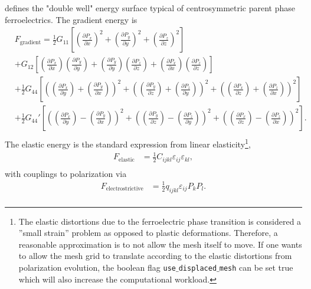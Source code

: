 \documentclass[paper=a4,14pt]{scrartcl} %
\begin{document}
%
defines the "double well" energy surface typical of centrosymmetric parent phase ferroelectrics. The gradient energy is
%
\begin{align}\label{grad}
&F_\mathrm{gradient}=\frac{1}{2} G_{11}  \left[ \left(\frac{\partial P_x}{\partial x} \right)^2 + \left(\frac{\partial P_y}{\partial y} \right)^2+\left(\frac{\partial P_z}{\partial z} \right)^2 \right] \\ \nonumber
&+  G_{12}  \left[\left(\frac{\partial P_x}{\partial x} \right)\left(\frac{\partial P_y}{\partial y} \right) + \left(\frac{\partial P_y}{\partial y} \right)\left(\frac{\partial P_z}{\partial z} \right) + \left(\frac{\partial P_x}{\partial x} \right)\left(\frac{\partial P_z}{\partial z} \right)\right] \\ \nonumber
&+ \frac{1}{2}G_{44} \left[\left(\left(\frac{\partial P_x}{\partial y} \right) + \left(\frac{\partial P_y}{\partial x} \right) \right)^2+ \left(\left(\frac{\partial P_y}{\partial z} \right) + \left(\frac{\partial P_z}{\partial y} \right) \right)^2+ \left(\left(\frac{\partial P_x}{\partial z} \right) + \left(\frac{\partial P_z}{\partial x} \right) \right)^2\right]\\ \nonumber
&+ \frac{1}{2} G_{44}' \left[\left(\left(\frac{\partial P_x}{\partial y} \right) - \left(\frac{\partial P_y}{\partial x} \right) \right)^2+\left(\left(\frac{\partial P_y}{\partial z} \right) - \left(\frac{\partial P_z}{\partial y} \right) \right)^2+\left(\left(\frac{\partial P_x}{\partial z} \right) - \left(\frac{\partial P_z}{\partial x} \right) \right)^2 \right]. \\ \nonumber
\end{align}
%
The elastic energy is the standard expression from linear elasticity\footnote{The elastic distortions due to the ferroelectric phase transition is considered a ''small strain'' problem as opposed to plastic deformations. Therefore, a reasonable approximation is to not allow the mesh itself to move. If one wants to allow the mesh grid to translate according to the elastic distortions from polarization evolution, the boolean flag \texttt{use$\_$displaced$\_$mesh} can be set true which will also increase the computational workload.},
%
\begin{align}\label{elastic}
F_\mathrm{elastic}&=\frac{1}{2} C_{ijkl} \varepsilon_{ij} \varepsilon_{kl}, \\ \nonumber
\end{align}
%
with couplings to polarization via
%
\begin{align}\label{elastic}
F_\mathrm{electrostrictive}&=\frac{1}{2} q_{ijkl} \varepsilon_{ij} P_k P_l. \\ \nonumber
\end{align}
\end{document}
